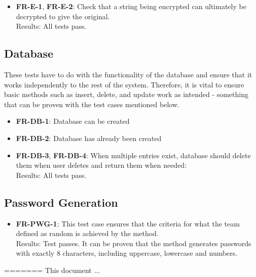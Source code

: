 \documentclass[12pt, titlepage]{article}
\begin{document}
		\begin{itemize}
			
			\item \textbf{FR-E-1}, \textbf{FR-E-2}: Check that a string being encrypted can ultimately be decrypted to give the original.\\
			Results: All tests pass.
		
		\end{itemize}	

	\subsection{Database}
		These tests have to do with the functionality of the database and ensure that it works independently to the rest of the system. Therefore, it is vital to ensure basic methods such as insert, delete, and update work as intended - something that can be proven with the test cases mentioned below.

		\begin{itemize}
			
			\item \textbf{FR-DB-1}: Database can be created
			\item \textbf{FR-DB-2}: Database has already been created
			\item \textbf{FR-DB-3}, \textbf{FR-DB-4}: When multiple entries exist, database should delete them when user deletes and return them when needed:\\
			Results: All tests pass. 

			
		\end{itemize}

	\subsection{Password Generation}

		\begin{itemize}

			\item \textbf{FR-PWG-1}: This test case ensures that the criteria for what the team defined as random is achieved by the method.\\
			Results: Test passes. It can be proven that the method generates passwords with exactly 8 characters, including uppercase, lowercase and numbers.

		\end{itemize}

=======
This document ...
\end{document}
